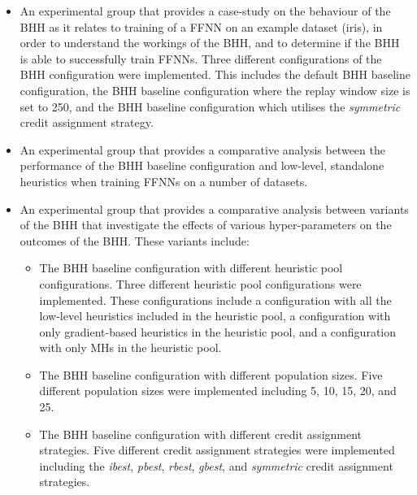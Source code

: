 \begin{itemize}
      \item An experimental group that provides a case-study on the behaviour of the \ac{BHH} as it relates to training of a \acs{FFNN} on an example dataset (iris), in order to understand the workings of the \acs{BHH}, and to determine if the \acs{BHH} is able to successfully train \acp{FFNN}. Three different configurations of the \acs{BHH} configuration were implemented. This includes the default \acs{BHH} baseline configuration, the \acs{BHH} baseline configuration where the replay window size is set to 250, and the \acs{BHH} baseline configuration which utilises the \textit{symmetric} credit assignment strategy.

      \item An experimental group that provides a comparative analysis between the performance of the \acs{BHH} baseline configuration and low-level, standalone heuristics when training \acp{FFNN} on a number of datasets.

      \item An experimental group that provides a comparative analysis between variants of the \ac{BHH} that investigate the effects of various hyper-parameters on the outcomes of the \acs{BHH}. These variants include:

            \begin{itemize}
                  \item The \acs{BHH} baseline configuration with different heuristic pool configurations. Three different heuristic pool configurations were implemented. These configurations include a configuration with all the low-level heuristics included in the heuristic pool, a configuration with only gradient-based heuristics in the heuristic pool, and a configuration with only \acp{MH} in the heuristic pool.

                  \item The \acs{BHH} baseline configuration with different population sizes. Five different population sizes were implemented including 5, 10, 15, 20, and 25.

                  \item The \acs{BHH} baseline configuration with different credit assignment strategies. Five different credit assignment strategies were implemented including the \textit{ibest}, \textit{pbest}, \textit{rbest}, \textit{gbest}, and \textit{symmetric} credit assignment strategies.


\end{itemize}
\end{itemize}
